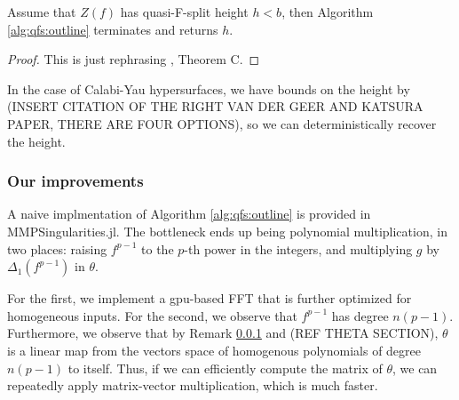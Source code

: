 \begin{thm}
	Assume that
	\(Z(f)\) has quasi-F-split height \(h < b\),
	then Algorithm \ref{alg:qfs:outline} terminates
	and returns \(h\).
\end{thm}

\begin{proof}
	This is just rephrasing \cite{kty-2022-fedder}, Theorem C.
\end{proof}

In the case of Calabi-Yau hypersurfaces, we have bounds on the height by
(INSERT CITATION OF THE RIGHT VAN DER GEER AND KATSURA PAPER, THERE ARE FOUR OPTIONS), 
so we can deterministically recover the height.  

\subsubsection{Our improvements}

A naive implmentation of Algorithm \ref{alg:qfs:outline}
is provided in MMPSingularities.jl.
The bottleneck ends up being polynomial multiplication, 
in two places:
raising \(f^{p-1}\) to the \(p\)-th power in the integers,
and multiplying \(g\) by \(\Delta_{1}(f^{p-1})\) 
in \(\theta\).

For the first, we implement a gpu-based FFT that is
further optimized for homogeneous inputs.
For the second, we observe that \(f^{p-1}\) has degree
\(n(p-1)\). 
Furthermore, we observe that by Remark \ref{} and 
(REF THETA SECTION), \(\theta\) is a linear map
from the vectors space of 
homogenous polynomials of degree \(n(p-1)\) 
to itself.
Thus, if we can efficiently compute the matrix of \(\theta\),
we can repeatedly apply matrix-vector multiplication,
which is much faster.


